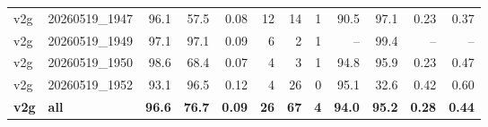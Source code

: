 \begin{table}[t]
\begin{tabular}{llrrrrrrrrrr}
v2g & 20260519\_1947 & 96.1 & 57.5 & 0.08 & 12 & 14 & 1 & 90.5 & 97.1 & 0.23 & 0.37 \\
v2g & 20260519\_1949 & 97.1 & 97.1 & 0.09 & 6 & 2 & 1 & -- & 99.4 & -- & -- \\
v2g & 20260519\_1950 & 98.6 & 68.4 & 0.07 & 4 & 3 & 1 & 94.8 & 95.9 & 0.23 & 0.47 \\
v2g & 20260519\_1952 & 93.1 & 96.5 & 0.12 & 4 & 26 & 0 & 95.1 & 32.6 & 0.42 & 0.60 \\
\textbf{v2g} & \textbf{all} & \textbf{96.6} & \textbf{76.7} & \textbf{0.09} & \textbf{26} & \textbf{67} & \textbf{4} & \textbf{94.0} & \textbf{95.2} & \textbf{0.28} & \textbf{0.44} \\
\bottomrule
\end{tabular}
\end{table}
